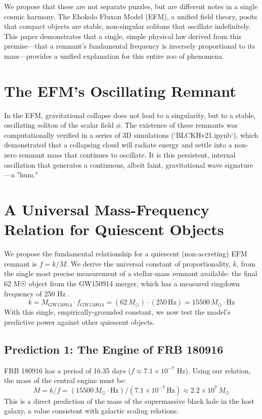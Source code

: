 \documentclass[11pt, twoside]{article}
\begin{document}
We propose that these are not separate puzzles, but are different notes in a single cosmic harmony. The Ehokolo Fluxon Model (EFM), a unified field theory, posits that compact objects are stable, non-singular solitons that oscillate indefinitely. This paper demonstrates that a single, simple physical law derived from this premise—that a remnant's fundamental frequency is inversely proportional to its mass—provides a unified explanation for this entire zoo of phenomena.

\section{The EFM's Oscillating Remnant}
In the EFM, gravitational collapse does not lead to a singularity, but to a stable, oscillating soliton of the scalar field \(\phi\). The existence of these remnants was computationally verified in a series of 3D simulations (`BLCKHv21.ipynb`), which demonstrated that a collapsing cloud will radiate energy and settle into a non-zero remnant mass that continues to oscillate. It is this persistent, internal oscillation that generates a continuous, albeit faint, gravitational wave signature—a "hum."

\section{A Universal Mass-Frequency Relation for Quiescent Objects}
We propose the fundamental relationship for a quiescent (non-accreting) EFM remnant is \(f = k/M\). We derive the universal constant of proportionality, \(k\), from the single most precise measurement of a stellar-mass remnant available: the final 62 M☉ object from the GW150914 merger, which has a measured ringdown frequency of 250 Hz \citep{LIGO2016}.
\[
k = M_{\text{GW150914}} \cdot f_{\text{GW150914}} = (62 \, M_\odot) \cdot (250 \, \text{Hz}) = 15500 \, M_\odot \cdot \text{Hz}
\]
With this single, empirically-grounded constant, we now test the model's predictive power against other quiescent objects.

\subsection{Prediction 1: The Engine of FRB 180916}
FRB 180916 has a period of 16.35 days (\(f \approx 7.1 \times 10^{-7}\) Hz). Using our relation, the mass of the central engine must be:
\[ M = k/f = (15500 \, M_\odot \cdot \text{Hz}) / (7.1 \times 10^{-7} \, \text{Hz}) \approx 2.2 \times 10^7 \, M_\odot \]
This is a direct prediction of the mass of the supermassive black hole in the host galaxy, a value consistent with galactic scaling relations.
\end{document}
